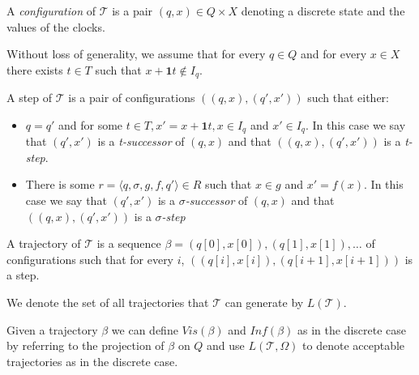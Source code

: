 \documentclass[table]{beamer}
\newcommand{\confPair}{\ensuremath{((q,x),(q',x'))}}
\begin{document}
\begin{frame}
	A \emph{configuration} of $\mathcal{T}$ is a pair $(q,x) \in Q \times X$ denoting a discrete
	state and the values of the clocks.

	\medskip

	Without loss of generality, we assume that for every $q \in Q$ and for every $x \in X$ there exists $t \in T$ such that $x+\textbf{1}t \not \in I_q$.
\end{frame}
\begin{frame}
	\begin{dfn}
		A step of $\mathcal{T}$ is a pair of configurations $\confPair$ such that either:
		\begin{itemize}
			\item $q=q'$ and for some $t \in T, x'=x+\textbf{1}t, x \in I_q$ and $x' \in I_q$. In this case we say that $(q',x')$ is a \emph{t-successor} of $(q,x)$ and that $\confPair$ is a \emph{t-step}.
			\item There is some $r = \langle q,\sigma,g,f,q'\rangle \in R$ such that $x \in g$ and $x' = f(x)$. In this case we say that $(q',x')$ is a \emph{$\sigma$-successor} of $(q,x)$ and that $\confPair$ is a \emph{$\sigma$-step} 
		\end{itemize}
		
		\medskip
		
		A trajectory of $\mathcal{T}$ is a sequence $ \beta = (q[0],x[0]),(q[1],x[1]),\ldots $ of configurations such that for every $i$, $((q[i],x[i]),(q[i+1],x[i+1]))$ is a step.
	\end{dfn}
\end{frame}

\begin{frame}
	We denote the set of all trajectories that $\mathcal{T}$ can generate by $L(\mathcal{T})$.

	\medskip

	Given a trajectory $\beta$ we can define $Vis(\beta)$ and $Inf(\beta)$ as in the discrete 
	case by referring to the projection of $\beta$ on $Q$ and use $L(\mathcal{T},\Omega)$ to 
	denote acceptable trajectories as in the discrete case.
\end{frame}
\end{document}
